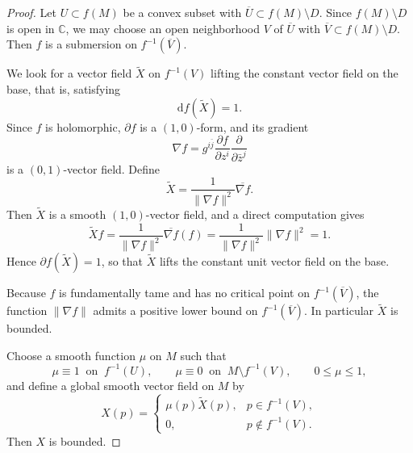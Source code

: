 \documentclass[11pt]{amsart}
\theoremstyle{plain}
\theoremstyle{definition}
\theoremstyle{remark}
\numberwithin{equation}{section}
\begin{document}
\begin{proof}
    Let $U \subset f(M)$ be a convex subset with $\overline{U} \subset f(M) \setminus D$.
    Since $f(M) \setminus D$ is open in $\mathbb{C}$, we may choose an open neighborhood $V$ of $\overline{U}$ with $\overline{V} \subset f(M) \setminus D$.
    Then $f$ is a submersion on $f^{-1}(\overline{V})$.

    We look for a vector field $\tilde{X}$ on $f^{-1}(V)$ lifting the constant vector field on the base, that is, satisfying
    \begin{equation}
        \mathrm{d}f(\tilde{X}) = 1.
    \end{equation}
    Since $f$ is holomorphic, $\partial f$ is a $(1,0)$-form, and its gradient
    \begin{equation}
        \nabla f = g^{i\bar{j}} \frac{\partial f}{\partial z^i} \frac{\partial}{\partial \bar{z}^j}
    \end{equation}
    is a $(0,1)$-vector field.
    Define
    \begin{equation}
        \tilde{X} = \frac{1}{\|\nabla f\|^2} \overline{\nabla f}.
    \end{equation}
    Then $\tilde{X}$ is a smooth $(1,0)$-vector field, and a direct computation gives
    \begin{equation}
        \tilde{X} f = \frac{1}{\|\nabla f\|^2} \overline{\nabla f}(f) = \frac{1}{\|\nabla f\|^2} \|\nabla f\|^2 = 1.
    \end{equation}
    Hence $\partial f(\tilde{X}) = 1$, so that $\tilde{X}$ lifts the constant unit vector field on the base.

    Because $f$ is fundamentally tame and has no critical point on $f^{-1}(\overline{V})$, the function $\|\nabla f\|$ admits a positive lower bound on $f^{-1}(\overline{V})$.
    In particular $\tilde{X}$ is bounded.

    Choose a smooth function $\mu$ on $M$ such that
    \begin{equation}
        \mu \equiv 1 \ \text{ on } \ f^{-1}(U), \qquad \mu \equiv 0 \ \text{ on } \ M \setminus f^{-1}(V), \qquad 0 \le \mu \le 1,
    \end{equation}
    and define a global smooth vector field on $M$ by
    \begin{equation}
        X(p) =
        \begin{cases}
            \mu(p)\tilde{X}(p), & p \in f^{-1}(V), \\
            0, & p \notin f^{-1}(V).
        \end{cases}
    \end{equation}
    Then $X$ is bounded.


\end{proof}
\end{document}
